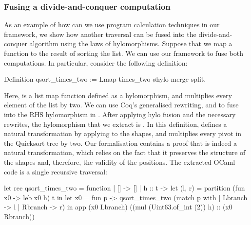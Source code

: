 \documentclass[a4paper,anonymous, UKenglish,cleveref, autoref, thm-restate]{lipics-v2021}
\begin{document}
\subsubsection{Fusing a divide-and-conquer computation}
As an example of how can we use program calculation techniques in our 
framework, we show how another traversal can be fused into the
divide-and-conquer algorithm using the laws of hylomorphisms.
Suppose that we map a function to the result of sorting the list. We can
use our framework to fuse both computations. In particular, consider
the following definition:
\begin{coqcode}
Definition qsort_times_two := Lmap times_two \o hylo merge split.
\end{coqcode}
Here,  is a list map function defined as a hylomorphism,
and  multiplies every element of the list by two.
We can use Coq's generalised rewriting, and  to fuse
 into the RHS hylomorphism in .
After applying hylo fusion and the necessary rewrites, the hylomorphism that we
extract is . In this definition,
 defines a natural transformation by applying  to
the shapes, and  multiplies every pivot in the Quicksort tree by
two. Our formalisation contains a proof that  is indeed a natural
transformation, which relies on the fact that it preserves the structure of the
shapes and, therefore, the validity of the positions.  The extracted OCaml code
is a single recursive traversal:
\begin{ocamlcode}
let rec qsort_times_two = function | [] -> []
| h :: t -> let (l, r) = partition (fun x0 -> leb x0 h) t in
            let x0 = fun p -> qsort_times_two (match p with
                                 | Lbranch -> l | Rbranch -> r) in
            app (x0 Lbranch) ((mul (Uint63.of_int (2)) h) :: (x0 Rbranch))
\end{ocamlcode}
\end{document}

